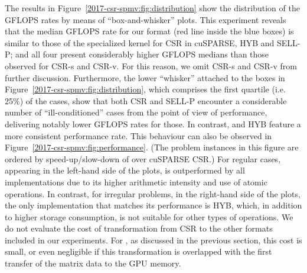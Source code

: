 The results in Figure~\ref{2017-csr-spmv:fig:distribution}
show the distribution of the GFLOPS rates
by means of ``box-and-whisker'' plots.
This experiment reveals that
the median GFLOPS rate for our \bcsr format
(red line inside the blue boxes) is similar 
to those of the specialized kernel for CSR in cuSPARSE, HYB and SELL-P;
and all four present considerably higher
GFLOPS medians than those observed for CSR-s and CSR-v.
For this reason, we omit CSR-s and CSR-v from further discussion.
Furthermore, the lower ``whisker'' attached to the boxes in
Figure~\ref{2017-csr-spmv:fig:distribution},
which comprises the first quartile (i.e. 25\%) of the cases,
show that both CSR and SELL-P encounter a
considerable number of ``ill-conditioned'' cases
from the point of view of performance,
delivering notably lower GFLOPS rates for those.
In contrast, \bcsr and HYB feature a more consistent performance rate.
This behaviour can also be observed in Figure~\ref{2017-csr-spmv:fig:performance}.
(The problem instances in this figure are ordered
by speed-up/slow-down of \bcsr over cuSPARSE CSR.)
For regular cases, appearing in the left-hand side of the plots, \bcsr is outperformed
by all implementations due to its higher arithmetic intensity
and use of atomic operations.
In contrast, for irregular problems, in the right-hand side of the plots,
the only implementation that matches its performance is HYB,
which, in addition to higher storage consumption,
is not suitable for other types of operations.
We do not evaluate the cost of transformation
from CSR to the other formats included in our experiments.
For \bcsr, as discussed in the previous section, this cost is small,
or even negligible if this transformation is overlapped
with the first transfer of the matrix data to the GPU memory.

